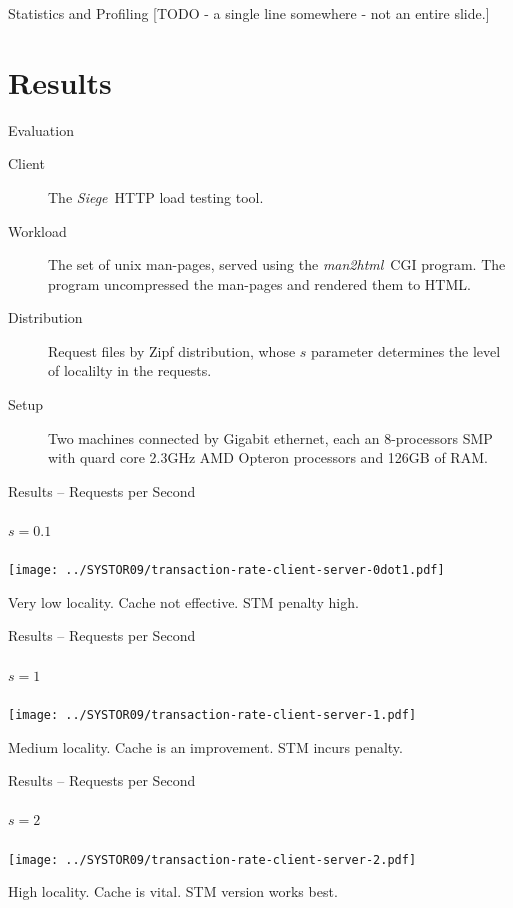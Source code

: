 \documentclass[]{beamer}
\newcommand{\Siege}{{\em Siege}~}
\newcommand{\ManToHtml}{{\em man2html}~}
\begin{document}
\begin{frame}{Statistics and Profiling}
[TODO - a single line somewhere - not an entire slide.]
\end{frame}

\section{Results}
\begin{frame}{Evaluation}
\begin{description}
\item[Client] The \Siege HTTP load testing tool.
\item[Workload] The set of unix man-pages, served using the \ManToHtml CGI
                program. The program uncompressed the man-pages and rendered
                them to HTML.
\item[Distribution] Request files by Zipf distribution, whose $s$ parameter
determines the level of localilty in the requests.
\item[Setup] Two machines connected by Gigabit ethernet, each an 8-processors
SMP with quard core 2.3GHz AMD Opteron processors and 126GB of RAM.
\end{description}
\end{frame}

\begin{frame}{Results -- Requests per Second}
\framesubtitle{$s=0.1$}
\texttt{[image: ../SYSTOR09/transaction-rate-client-server-0dot1.pdf]}

Very \alert{low} locality. Cache not effective. STM penalty high.
\end{frame}

\begin{frame}{Results -- Requests per Second}
\framesubtitle{$s=1$}
\texttt{[image: ../SYSTOR09/transaction-rate-client-server-1.pdf]}

\alert{Medium} locality. Cache is an improvement. STM incurs penalty.
\end{frame}

\begin{frame}{Results -- Requests per Second}
\framesubtitle{$s=2$}
\texttt{[image: ../SYSTOR09/transaction-rate-client-server-2.pdf]}

\alert{High} locality. Cache is vital. STM version works best.
\end{frame}
\end{document}
